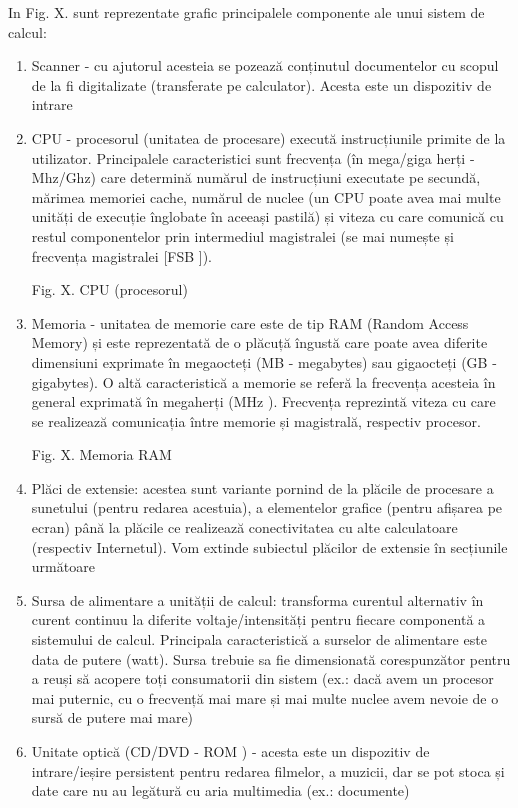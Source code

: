 In Fig. X. sunt reprezentate grafic principalele componente ale unui sistem de calcul:
\begin{enumerate}
	\item Scanner - cu ajutorul acesteia se pozează conținutul documentelor
		cu scopul de la fi digitalizate (transferate pe calculator).
		Acesta este un dispozitiv de intrare
	\item CPU - procesorul (unitatea de procesare) execută instrucțiunile
		primite de la utilizator. Principalele caracteristici sunt
		frecvența (în mega/giga herți - Mhz/Ghz) care determină numărul
		de instrucțiuni executate pe secundă, mărimea memoriei cache,
		numărul de nuclee (un CPU poate avea mai multe unități de
		execuție înglobate în aceeași pastilă) și viteza cu care
		comunică cu restul componentelor prin intermediul magistralei
		(se mai numește și frecvența magistralei [FSB
		]).

Fig. X. CPU (procesorul)

	\item Memoria - unitatea de memorie care este de tip RAM
		 (Random Access Memory) și
		este reprezentată de o plăcuță îngustă care poate avea diferite
		dimensiuni exprimate în megaocteți (MB  -
		megabytes) sau gigaocteți (GB  -
		gigabytes). O altă caracteristică a memorie se referă la
		frecvența acesteia în general exprimată în megaherți (MHz
		). Frecvența reprezintă viteza cu care
		se realizează comunicația între memorie și magistrală, respectiv
		procesor.

Fig. X. Memoria RAM
	\item Plăci de extensie: acestea sunt variante pornind de la plăcile de
		procesare a sunetului (pentru redarea acestuia), a elementelor
		grafice (pentru afișarea pe ecran) până la plăcile ce realizează
		conectivitatea cu alte calculatoare (respectiv Internetul). Vom
		extinde subiectul plăcilor de extensie în secțiunile următoare
	\item Sursa de alimentare a unității de calcul: transforma curentul
		alternativ în curent continuu la diferite voltaje/intensități
		pentru fiecare componentă a sistemului de calcul. Principala
		caracteristică a surselor de alimentare este data de putere
		(watt). Sursa trebuie sa fie dimensionată corespunzător pentru a
		reuși să acopere toți consumatorii din sistem (ex.: dacă avem un
		procesor mai puternic, cu o frecvență mai mare și mai multe
		nuclee avem nevoie de o sursă de putere mai mare)
	\item Unitate optică (CD/DVD - ROM ) -
		acesta este un dispozitiv de intrare/ieșire persistent pentru
		redarea filmelor, a muzicii, dar se pot stoca și date care nu au
		legătură cu aria multimedia (ex.: documente)


\end{enumerate}
